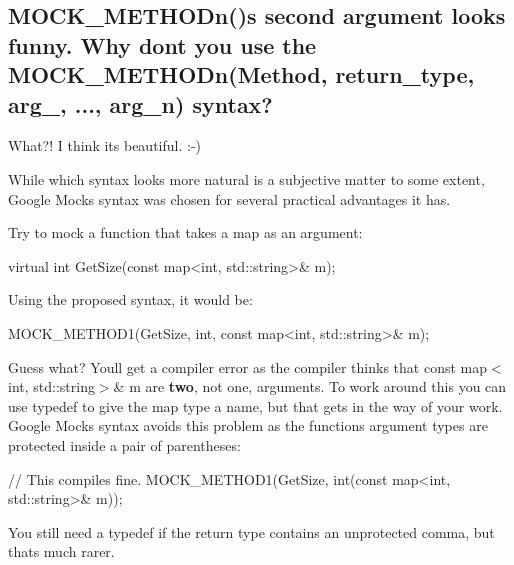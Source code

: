 \subsection*{M\+O\+C\+K\+\_\+\+M\+E\+T\+H\+O\+Dn()\textquotesingle{}s second argument looks funny. Why don\textquotesingle{}t you use the M\+O\+C\+K\+\_\+\+M\+E\+T\+H\+O\+Dn(Method, return\+\_\+type, arg\+\_, ..., arg\+\_\+n) syntax?}

What?! I think it\textquotesingle{}s beautiful. \+:-\/)

While which syntax looks more natural is a subjective matter to some extent, Google Mock\textquotesingle{}s syntax was chosen for several practical advantages it has.

Try to mock a function that takes a map as an argument\+: 
\begin{DoxyCode}
virtual int GetSize(const map<int, std::string>& m);
\end{DoxyCode}


Using the proposed syntax, it would be\+: 
\begin{DoxyCode}
MOCK\_METHOD1(GetSize, int, const map<int, std::string>& m);
\end{DoxyCode}


Guess what? You\textquotesingle{}ll get a compiler error as the compiler thinks that {\ttfamily const map$<$int, std\+::string$>$\& m} are {\bfseries two}, not one, arguments. To work around this you can use {\ttfamily typedef} to give the map type a name, but that gets in the way of your work. Google Mock\textquotesingle{}s syntax avoids this problem as the function\textquotesingle{}s argument types are protected inside a pair of parentheses\+: 
\begin{DoxyCode}
// This compiles fine.
MOCK\_METHOD1(GetSize, int(const map<int, std::string>& m));
\end{DoxyCode}


You still need a {\ttfamily typedef} if the return type contains an unprotected comma, but that\textquotesingle{}s much rarer.

